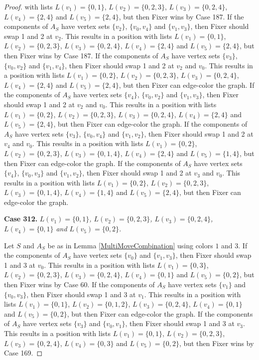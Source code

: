 \documentclass[12pt]{amsart}
\theoremstyle{plain}
\theoremstyle{definition}
\theoremstyle{remark}
\begin{document}
\begin{proof}
with lists $L(v_1) = \{0, 1\}$, $L(v_2) = \{0, 2, 3\}$, $L(v_3) = \{0, 2, 4\}$, $L(v_4) = \{2, 4\}$ and $L(v_5) = \{2, 4\}$, but then Fixer wins by Case 187. If the components of $A_S$ have vertex sets $\{v_2\}$, $\{v_0, v_4\}$ and $\{v_1, v_3\}$, then Fixer should swap 1 and 2 at $v_2$. This results in a position with lists $L(v_1) = \{0, 1\}$, $L(v_2) = \{0, 2, 3\}$, $L(v_3) = \{0, 2, 4\}$, $L(v_4) = \{2, 4\}$ and $L(v_5) = \{2, 4\}$, but then Fixer wins by Case 187. If the components of $A_S$ have vertex sets $\{v_3\}$, $\{v_0, v_2\}$ and $\{v_1, v_4\}$, then Fixer should swap 1 and 2 at $v_2$ and $v_0$. This results in a position with lists $L(v_1) = \{0, 2\}$, $L(v_2) = \{0, 2, 3\}$, $L(v_3) = \{0, 2, 4\}$, $L(v_4) = \{2, 4\}$ and $L(v_5) = \{2, 4\}$, but then Fixer can edge-color the graph. If the components of $A_S$ have vertex sets $\{v_4\}$, $\{v_0, v_2\}$ and $\{v_1, v_3\}$, then Fixer should swap 1 and 2 at $v_2$ and $v_0$. This results in a position with lists $L(v_1) = \{0, 2\}$, $L(v_2) = \{0, 2, 3\}$, $L(v_3) = \{0, 2, 4\}$, $L(v_4) = \{2, 4\}$ and $L(v_5) = \{2, 4\}$, but then Fixer can edge-color the graph. If the components of $A_S$ have vertex sets $\{v_3\}$, $\{v_0, v_4\}$ and $\{v_1, v_2\}$, then Fixer should swap 1 and 2 at $v_4$ and $v_0$. This results in a position with lists $L(v_1) = \{0, 2\}$, $L(v_2) = \{0, 2, 3\}$, $L(v_3) = \{0, 1, 4\}$, $L(v_4) = \{2, 4\}$ and $L(v_5) = \{1, 4\}$, but then Fixer can edge-color the graph. If the components of $A_S$ have vertex sets $\{v_4\}$, $\{v_0, v_3\}$ and $\{v_1, v_2\}$, then Fixer should swap 1 and 2 at $v_3$ and $v_0$. This results in a position with lists $L(v_1) = \{0, 2\}$, $L(v_2) = \{0, 2, 3\}$, $L(v_3) = \{0, 1, 4\}$, $L(v_4) = \{1, 4\}$ and $L(v_5) = \{2, 4\}$, but then Fixer can edge-color the graph. 

\noindent\textbf{Case 312.  }\textit{$L(v_1) = \{0, 1\}$, $L(v_2) = \{0, 2, 3\}$, $L(v_3) = \{0, 2, 4\}$, $L(v_4) = \{0, 1\}$ and $L(v_5) = \{0, 2\}$.}

Let $S$ and $A_S$ be as in Lemma \ref{MultiMoveCombination} using colors $1$ and $3$. If the components of $A_S$ have vertex sets $\{v_0\}$ and $\{v_1, v_3\}$, then Fixer should swap 1 and 3 at $v_0$. This results in a position with lists $L(v_1) = \{0, 3\}$, $L(v_2) = \{0, 2, 3\}$, $L(v_3) = \{0, 2, 4\}$, $L(v_4) = \{0, 1\}$ and $L(v_5) = \{0, 2\}$, but then Fixer wins by Case 60. If the components of $A_S$ have vertex sets $\{v_1\}$ and $\{v_0, v_3\}$, then Fixer should swap 1 and 3 at $v_1$. This results in a position with lists $L(v_1) = \{0, 1\}$, $L(v_2) = \{0, 1, 2\}$, $L(v_3) = \{0, 2, 4\}$, $L(v_4) = \{0, 1\}$ and $L(v_5) = \{0, 2\}$, but then Fixer can edge-color the graph. If the components of $A_S$ have vertex sets $\{v_3\}$ and $\{v_0, v_1\}$, then Fixer should swap 1 and 3 at $v_3$. This results in a position with lists $L(v_1) = \{0, 1\}$, $L(v_2) = \{0, 2, 3\}$, $L(v_3) = \{0, 2, 4\}$, $L(v_4) = \{0, 3\}$ and $L(v_5) = \{0, 2\}$, but then Fixer wins by Case 169. 


\end{proof}
\end{document}
